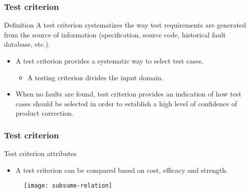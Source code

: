 \begin{frame}[parent={cmap:software-testing},hasnext=true,hasprev=true]
\label{concept:test-criterion}
\frametitle{Test criterion}

\begin{block:concept}{Definition}
A test criterion systematizes the way test requirements are
generated from the source of information (specification, source code,
historical fault database, etc.).
\end{block:concept}

\begin{block:fact}{}
\begin{itemize}
	\item A test criterion provides a systematic way to select test cases.
	\begin{itemize}
		\item A testing criterion divides the input domain.
	\end{itemize}

	\item When no faults are found, test criterion provides an indication of
	how test cases should be selected in order to establish a high level of
	confidence of product correction.
\end{itemize}
\end{block:fact}

\hfill
{}
\end{frame}


\begin{frame}
\frametitle{Test criterion}

\begin{block:fact}{Test criterion attributes}
\begin{itemize}
	\item A test criterion can be compared based on cost, efficacy and
	strength.
\end{itemize}
\end{block:fact}

\begin{figure}
    \centering
    \texttt{[image: subsume-relation]}
\end{figure}
\end{frame}
